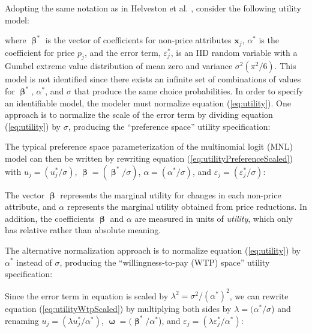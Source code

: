 \documentclass[article]{jss}
\begin{document}
Adopting the same notation as in Helveston et al.
\citeyearpar{Helveston2018}, consider the following utility model:



where \(\boldsymbol\upbeta^{*}\) is the vector of coefficients for
non-price attributes \(\mathrm{\mathbf{x}}_{j}\), \(\alpha^{*}\) is the
coefficient for price \(p_{j}\), and the error term,
\(\varepsilon^{*}_{j}\), is an IID random variable with a Gumbel extreme
value distribution of mean zero and variance \(\sigma^2(\pi^2/6)\). This
model is not identified since there exists an infinite set of
combinations of values for \(\boldsymbol\upbeta^{*}\), \(\alpha^{*}\),
and \(\sigma\) that produce the same choice probabilities. In order to
specify an identifiable model, the modeler must normalize equation
(\ref{eq:utility}). One approach is to normalize the scale of the error
term by dividing equation (\ref{eq:utility}) by \(\sigma\), producing
the ``preference space'' utility specification:



The typical preference space parameterization of the multinomial logit
(MNL) model can then be written by rewriting equation
(\ref{eq:utilityPreferenceScaled}) with \(u_j = (u^*_j / \sigma)\),
\(\boldsymbol\upbeta= (\boldsymbol\upbeta^{*} / \sigma)\),
\(\alpha = (\alpha^{*} / \sigma)\), and
\(\varepsilon_{j} = (\varepsilon^{*}_{j} / \sigma)\):



The vector \(\boldsymbol\upbeta\) represents the marginal utility for
changes in each non-price attribute, and \(\alpha\) represents the
marginal utility obtained from price reductions. In addition, the
coefficients \(\boldsymbol\upbeta\) and \(\alpha\) are measured in units
of \emph{utility}, which only has relative rather than absolute meaning.

The alternative normalization approach is to normalize equation
(\ref{eq:utility}) by \(\alpha^*\) instead of \(\sigma\), producing the
``willingness-to-pay (WTP) space'' utility specification:



Since the error term in equation is scaled by
\(\lambda^2 = \sigma^2/(\alpha^{*})^2\), we can rewrite equation
(\ref{eq:utilityWtpScaled}) by multiplying both sides by
\(\lambda= (\alpha^{*} / \sigma\)) and renaming
\(u_j = (\lambda u^*_j / \alpha^*)\),
\(\boldsymbol\upomega= (\boldsymbol\upbeta^{*} / \alpha^{*}\)), and
\(\varepsilon_j = (\lambda \varepsilon^*_j / \alpha^*)\):
\end{document}
